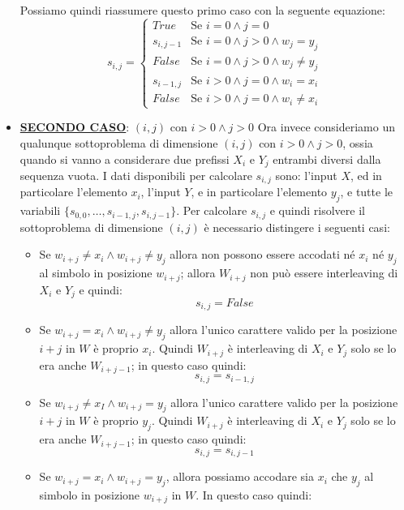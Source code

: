 \documentclass[12pt]{article}
\begin{document}
\begin{itemize}
    Possiamo quindi riassumere questo primo caso con la seguente equazione:
    \begin{equation*}
        s_{i,j} = \begin{cases}
            True & \textrm{Se } i = 0 \land j = 0 \\
            s_{i, j-1} & \textrm{Se } i = 0 \land j > 0 \land w_j = y_j \\
            False & \textrm{Se } i = 0 \land j > 0  \land w_j \neq y_j\\
            s_{i-1, j} & \textrm{Se } i > 0 \land j = 0 \land w_i = x_i \\
            False & \textrm{Se } i > 0 \land j = 0 \land w_i \neq x_i
        \end{cases}
    \end{equation*}
    \item \textbf{\underline{SECONDO CASO}}: $(i, j)$ con $i > 0 \land j > 0$ \newline
    Ora invece consideriamo un qualunque sottoproblema di dimensione $(i,j)$ con $i > 0 \land j > 0$, ossia quando si vanno a considerare due prefissi $X_i$ e $Y_j$ entrambi diversi dalla sequenza vuota.
    I dati disponibili per calcolare $s_{i,j}$ sono: l'input $X$, ed in particolare l'elemento $x_i$, l'input $Y$, e in particolare l'elemento $y_j$, e tutte le variabili $\{s_{0,0}, \dots, s_{i-1, j}, s_{i, j-1}\}$. Per
    calcolare $s_{i,j}$ e quindi risolvere il sottoproblema di dimensione $(i,j)$ è necessario distingere i seguenti casi:
    \begin{itemize}
        \item Se $w_{i+j} \neq x_i \land w_{i+j} \neq y_j$ allora non possono essere accodati né $x_i$ né $y_j$ al simbolo in posizione $w_{i+j}$; allora $W_{i+j}$ non può essere interleaving di $X_i$ e $Y_j$ e quindi:
        $$s_{i,j} = False$$
        \item Se $w_{i+j} = x_i \land w_{i+j} \neq y_j$ allora l'unico carattere valido per la posizione $i+j$ in $W$ è proprio $x_i$. Quindi $W_{i+j}$ è interleaving di $X_i$ e $Y_j$ solo se lo era anche $W_{i+j-1}$; in questo caso quindi:
        $$s_{i,j} = s_{i-1,j}$$
        \item Se $w_{i+j} \neq x_I \land w_{i+j} = y_j$ allora l'unico carattere valido per la posizione $i+j$ in $W$ è proprio $y_j$. Quindi $W_{i+j}$ è interleaving di $X_i$ e $Y_j$ solo se lo era anche $W_{i+j-1}$; in questo caso quindi:
        $$s_{i,j} = s_{i, j-1}$$
        \item Se $w_{i+j} = x_i \land w_{i+j} = y_j$, allora possiamo accodare sia $x_i$ che $y_j$ al simbolo in posizione $w_{i+j}$ in $W$. In questo caso quindi:

\end{itemize}
\end{itemize}
\end{document}
